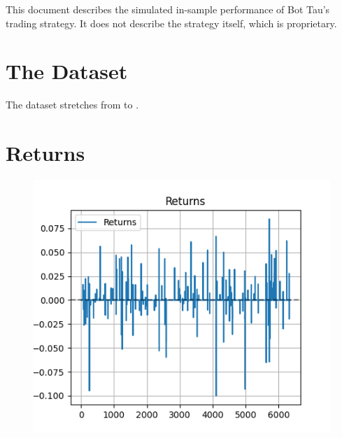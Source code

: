 \documentclass[a4paper]{article}
\title{\documenttitle}
\date{\today}
\author{Frans Englich \\
        \href{mailto:fenglich@fastmail.fm}{fenglich@fastmail.fm}}
\begin{document}
\maketitle

This document describes the simulated in-sample performance of Bot Tau's trading
strategy. It does not describe the strategy itself, which is proprietary.

\section{The Dataset}

The dataset stretches from \constantStartdate to \constantEnddate.

\section{Returns}

\begin{figure}[H]
    \begin{center}
        \includegraphics{../generated/returns.png}
    \end{center}
\end{figure}
\end{document}
